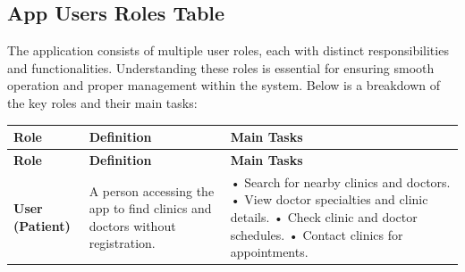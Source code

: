 \documentclass[12pt]{report}
\begin{document}
\newpage
\subsection{App Users Roles Table}
\noindent The application consists of multiple user roles, each with distinct responsibilities and functionalities. Understanding these roles is essential for ensuring smooth operation and proper management within the system. Below is a breakdown of the key roles and their main tasks:
\vspace{0.2cm}
\renewcommand{\arraystretch}{1.3} %

\begin{longtable}{|p{3cm}|p{6cm}|p{6cm}|}

	\hline
	\rowcolor[HTML]{C0C0C0}
	\hspace*{1cm}\textbf{Role}                                                                                 & \hspace*{1.9cm} \textbf{Definition}                                                 & \hspace*{1.9cm}\textbf{Main Tasks} \\
	\hline
	\endfirsthead

	\hline
	\rowcolor[HTML]{C0C0C0}
	\hspace*{1cm}\textbf{Role}                                                                                 & \hspace*{1.9cm} \textbf{Definition}                                                 & \hspace*{1.9cm}\textbf{Main Tasks} \\
	\hline
	\endhead

	\hspace*{0.1cm}\textbf{User (Patient)}                                                                     & A person accessing the app to find clinics and doctors without registration.        &
	• Search for nearby clinics and doctors.\newline
	• View doctor specialties and clinic details.\newline
	• Check clinic and doctor schedules.\newline
	• Contact clinics for appointments.                                                                                                                                                                                                   \\
	\hline


\end{longtable}
\end{document}

